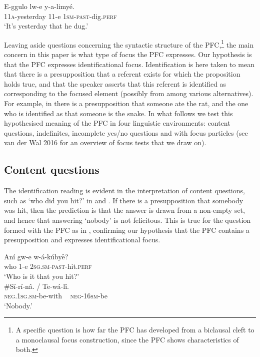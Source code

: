 \documentclass[output=paper]{langsci/langscibook}
\begin{document}
\ea\label{ex:vanderwal:11}
\gll E-ggulo    lw-e  y-a-limyé.\\
     11\textsc{a}-yesterday  11-e  \textsc{1sm}-\textsc{past}-dig.\textsc{perf}\\
\glt ‘It’s yesterday that he dug.’
\z

Leaving aside questions concerning the syntactic structure of the PFC,\footnote{A specific question is how far the PFC has developed from a biclausal cleft to a monoclausal focus construction, since the PFC shows characteristics of both.}{} the main concern in this paper is what type of focus the PFC expresses. Our hypothesis is that the PFC expresses identificational focus. Identification is here taken to mean that there is a presupposition that a referent exists for which the proposition holds true, and that the speaker asserts that this referent is identified as corresponding to the focused element (possibly from among various alternatives). For example, in  there is a presupposition that someone ate the rat, and the one who is identified as that someone is the snake. In what follows we test this hypothesised meaning of the  PFC in four linguistic environments: content questions, indefinites, incomplete yes/no questions and with focus particles (see van der Wal 2016 for an overview of focus tests that we draw on).

\subsection{Content questions}\label{sec:vanderwal:3.1} %

The identification reading is evident in the interpretation of content questions, such as ‘who did you hit?’ in  and . If there is a presupposition that somebody was hit, then the prediction is that the answer is drawn from a non-empty set, and hence that answering ‘nobody’ is not felicitous. This is true for the question formed with the PFC as in , confirming our hypothesis that the PFC contains a presupposition and expresses identificational focus. 

\ea\label{ex:vanderwal:12}
\gll Aní  gw-e  w-á-kúbyȇ?\\
     who  1-e  \textsc{2sg.sm-past}-hit.\textsc{perf}\\
\glt ‘Who is it that you hit?’\\{}
\gll \#Sí-rí-nâ.    /  Te-wá-lî.\\
     \textsc{neg.1sg.sm}-be-with   ~ \textsc{neg-16sm}-be\\
\glt ‘Nobody.’
\z
\end{document}

